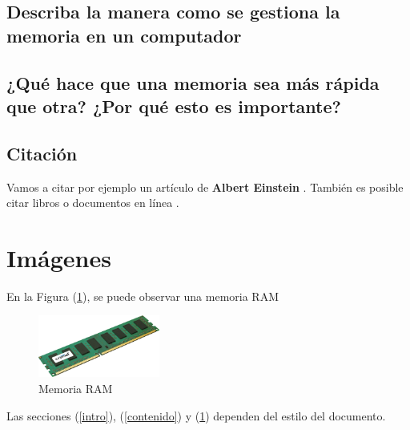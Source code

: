 \documentclass{article}
\begin{document}
\subsection{Describa la manera como se gestiona la memoria en un computador}


\subsection{¿Qué hace que una memoria sea más rápida que otra? ¿Por qué esto es importante?}
 \subsection{ Citación}
 
Vamos a citar por ejemplo un artículo de \textbf{Albert Einstein} \cite{einstein}.
También es posible citar libros \cite{dirac} o documentos en línea \cite{knuthwebsite}.

\section{Imágenes} \label{imagenes}

En la Figura (\ref{fig:memoria}), se puede observar una memoria RAM

\begin{figure}[h]
\includegraphics[width=4cm]{memoria.png}
\centering
\caption{Memoria RAM}
\label{fig:memoria}
\end{figure}

Las secciones (\ref{intro}), (\ref{contenido}) y (\ref{imagenes}) dependen del estilo del documento.
\newpage


\end{document}
